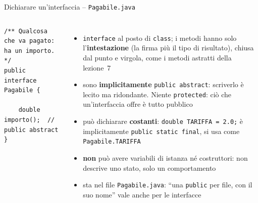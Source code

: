 \documentclass[10pt,aspectratio=169]{beamer}
\begin{document}
\begin{frame}[fragile]{Dichiarare un'interfaccia -- \texttt{Pagabile.java}}
\begin{columns}[T]
\begin{lstlisting}[basicstyle=\ttfamily\scriptsize]
/** Qualcosa che va pagato: ha un importo. */
public interface Pagabile {

    double importo();  // public abstract
}
\end{lstlisting}
\footnotesize
\begin{itemize}\itemsep=3pt
    \item \texttt{interface} al posto di \texttt{class}; i metodi hanno solo l'\textbf{intestazione} (la firma più il tipo di risultato), chiusa dal punto e virgola, come i metodi astratti della lezione~7
    \item sono \textbf{implicitamente} \texttt{public abstract}: scriverlo è lecito ma ridondante. Niente \texttt{protected}: ciò che un'interfaccia offre è tutto pubblico
    \item può dichiarare \textbf{costanti}: \texttt{double TARIFFA = 2.0;} è implicitamente \texttt{public static final}, si usa come \texttt{Pagabile.TARIFFA}
    \item \textbf{non} può avere variabili di istanza né costruttori: non descrive uno stato, solo un comportamento
    \item sta nel file \texttt{Pagabile.java}: ``una \texttt{public} per file, con il suo nome'' vale anche per le interfacce
\end{itemize}


\end{columns}
\end{frame}
\end{document}
